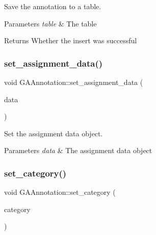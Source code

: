 Save the annotation to a table. 


\begin{DoxyParams}{Parameters}
{\em table} & The table \\
\hline
\end{DoxyParams}
\begin{DoxyReturn}{Returns}
Whether the insert was successful 
\end{DoxyReturn}
\mbox{\label{class_g_a_annotation_a6dfc89a54027eefa6d3f7928faf22593}} 
\subsubsection{\texorpdfstring{set\+\_\+assignment\+\_\+data()}{set\_assignment\_data()}}
{\footnotesize\ttfamily void G\+A\+Annotation\+::set\+\_\+assignment\+\_\+data (\begin{DoxyParamCaption}\item[{\hyperlink{class_g_a_assignment_data}{G\+A\+Assignment\+Data} $\ast$}]{data }\end{DoxyParamCaption})}



Set the assignment data object. 


\begin{DoxyParams}{Parameters}
{\em data} & The assignment data object \\
\hline
\end{DoxyParams}
\mbox{\label{class_g_a_annotation_ad8ed14e09ee68b1dfcff6afada72b438}} 
\subsubsection{\texorpdfstring{set\+\_\+category()}{set\_category()}}
{\footnotesize\ttfamily void G\+A\+Annotation\+::set\+\_\+category (\begin{DoxyParamCaption}\item[{std\+::string}]{category }\end{DoxyParamCaption})}



